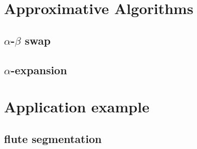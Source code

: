 \documentclass{beamer}
\begin{document}
\section{Approximative Algorithms}
\subsection{$\alpha$-$\beta$ swap}
\subsection{$\alpha$-expansion}

\section{Application example}
\subsection{flute segmentation}



	
	
	
\end{document}
